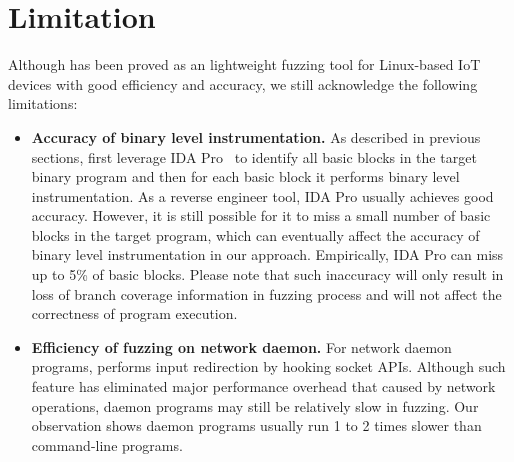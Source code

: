\section{Limitation}\label{sec:limit}
Although \sysname has been proved as an lightweight fuzzing tool for Linux-based IoT devices with good efficiency and accuracy, we still acknowledge the following limitations:
\begin{itemize}

 \item {\bf Accuracy of binary level instrumentation.} As described in previous sections, \sysname first leverage IDA Pro~\cite{ida} to identify all basic blocks in the target binary program and then for each basic block it performs binary level instrumentation. As a reverse engineer tool, IDA Pro usually achieves good accuracy. However, it is still possible for it to miss a small number of basic blocks in the target program, which can eventually affect the accuracy of binary level instrumentation in our approach. Empirically, IDA Pro can miss up to 5\% of basic blocks. Please note that such inaccuracy will only result in loss of branch coverage information in fuzzing process and will not affect the correctness of program execution.   
 
 \item {\bf Efficiency of fuzzing on network daemon.} For network daemon programs, \sysname performs input redirection by hooking socket APIs. Although such feature has eliminated major performance overhead that caused by network operations, daemon programs may still be relatively slow in fuzzing. Our observation shows daemon programs usually run 1 to 2 times slower than command-line programs. 
\end{itemize}